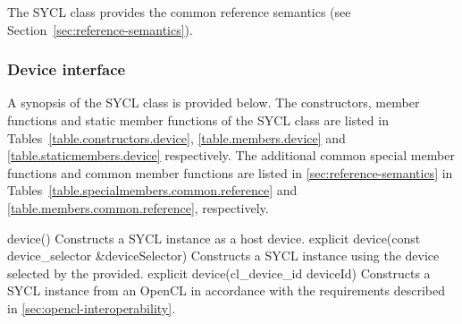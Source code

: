 The SYCL  class provides the common reference semantics
(see Section~\ref{sec:reference-semantics}).

\subsubsection{Device interface}

A synopsis of the SYCL  class is provided below. The constructors, member functions and static member functions of the SYCL  class are listed in Tables~\ref{table.constructors.device}, \ref{table.members.device} and \ref{table.staticmembers.device} respectively. The additional common special member functions and common member functions are listed in \ref{sec:reference-semantics} in Tables~\ref{table.specialmembers.common.reference} and \ref{table.members.common.reference}, respectively.


  \addRow
    {device()}
    {
      Constructs a SYCL  instance as a host device.
    }
  \addRow
    {explicit device(const device_selector \&deviceSelector)}
    {
      Constructs a SYCL  instance using the device selected by the  provided.
    }
  \addRow
    {explicit device(cl_device_id deviceId)}
    {    
     Constructs a SYCL  instance from an OpenCL  in accordance with the requirements described in \ref{sec:opencl-interoperability}.
    }
\completeTable

